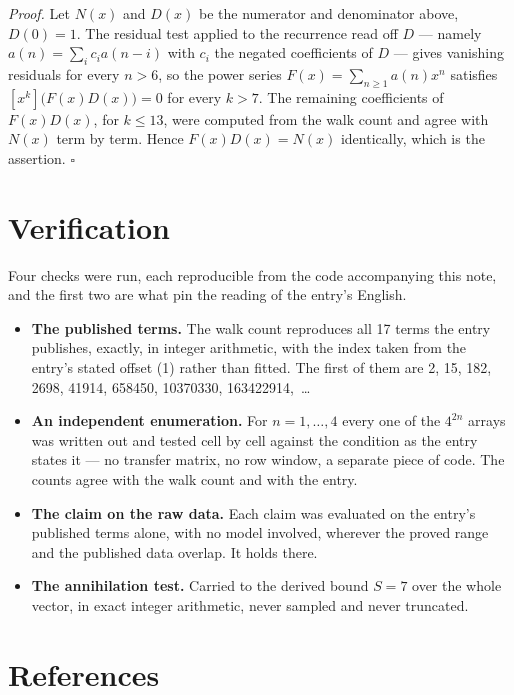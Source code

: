 \documentclass[11pt]{article}
\theoremstyle{definition}
\begin{document}
{\itshape Proof.} Let $N(x)$ and $D(x)$ be the numerator and denominator above, $D(0)=1$. The residual test applied to the recurrence read off $D$ --- namely $a(n) = \sum_i c_i a(n-i)$ with $c_i$ the negated coefficients of $D$ --- gives vanishing residuals for every $n > 6$, so the power series $F(x)=\sum_{n\ge 1}a(n)x^n$ satisfies $[x^k]\bigl(F(x)D(x)\bigr) = 0$ for every $k > 7$. The remaining coefficients of $F(x)D(x)$, for $k \le 13$, were computed from the walk count and agree with $N(x)$ term by term. Hence $F(x)D(x) = N(x)$ identically, which is the assertion. $\square$

\section{Verification}

Four checks were run, each reproducible from the code accompanying this note, and the first two are what pin the reading of the entry's English.

\begin{itemize}

\item {\bfseries The published terms.} The walk count reproduces all 17 terms the entry publishes, exactly, in integer arithmetic, with the index taken from the entry's stated offset (1) rather than fitted. The first of them are 2, 15, 182, 2698, 41914, 658450, 10370330, 163422914,~\dots

\item {\bfseries An independent enumeration.} For $n = 1,\dots,4$ every one of the $4^{2n}$ arrays was written out and tested cell by cell against the condition as the entry states it --- no transfer matrix, no row window, a separate piece of code. The counts agree with the walk count and with the entry.

\item {\bfseries The claim on the raw data.} Each claim was evaluated on the entry's published terms alone, with no model involved, wherever the proved range and the published data overlap. It holds there.

\item {\bfseries The annihilation test.} Carried to the derived bound $S = 7$ over the whole vector, in exact integer arithmetic, never sampled and never truncated.

\end{itemize}

\section{References}
\end{document}
